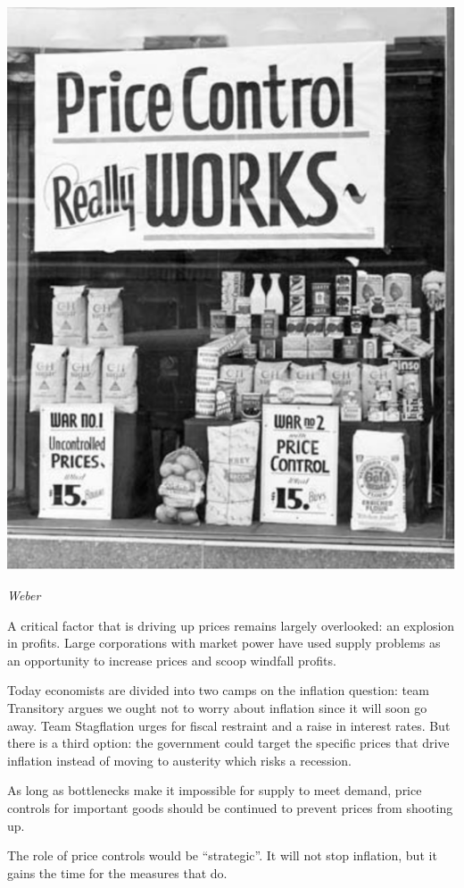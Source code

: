 \documentclass[
]{book}
\begin{document}
\includegraphics{fig/price_control_window.png}

\emph{Weber}

A critical factor that is driving up prices remains largely overlooked:
an explosion in profits.
Large corporations with market power have used supply problems as an opportunity to increase prices and scoop windfall profits.

Today economists are divided into two camps on the inflation question: team Transitory argues we ought not to worry about inflation since it will soon go away. Team Stagflation urges for fiscal restraint and a raise in interest rates. But there is a third option: the government could target the specific prices that drive inflation instead of moving to austerity which risks a recession.

As long as bottlenecks make it impossible for supply to meet demand, price controls for important goods should be continued to prevent prices from shooting up.

The role of price controls would be ``strategic''.
It will not stop inflation, but it gains the time for the measures that do.
\end{document}

